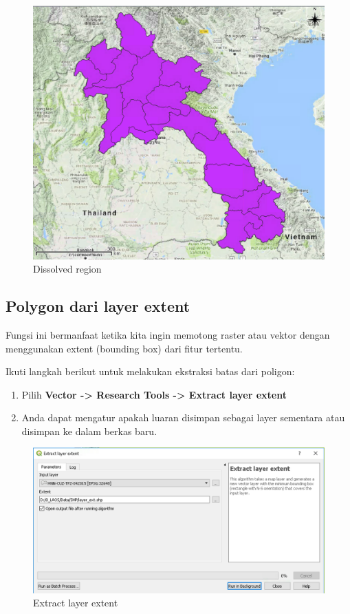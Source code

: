 \documentclass[]{book}
\begin{document}
\begin{figure}

{\centering \includegraphics[width=0.7\linewidth]{images/04/fig21} 

}

\caption{Dissolved region}\label{fig:fig1421}
\end{figure}

\hypertarget{polygon-dari-layer-extent}{%
\subsection{Polygon dari layer extent}\label{polygon-dari-layer-extent}}

Fungsi ini bermanfaat ketika kita ingin memotong raster atau vektor dengan menggunakan extent (bounding box) dari fitur tertentu.

Ikuti langkah berikut untuk melakukan ekstraksi batas dari poligon:

\begin{enumerate}
\def\labelenumi{\arabic{enumi}.}
\item
  Pilih \textbf{Vector -\textgreater{} Research Tools -\textgreater{} Extract layer extent}
\item
  Anda dapat mengatur apakah luaran disimpan sebagai layer sementara atau disimpan ke dalam berkas baru.
\end{enumerate}

\begin{figure}

{\centering \includegraphics[width=0.7\linewidth]{images/04/fig22} 

}

\caption{Extract layer extent}\label{fig:fig1422}
\end{figure}
\end{document}
